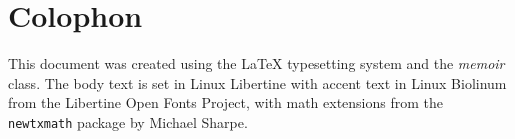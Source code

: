 \documentclass[../book/calcnotes.tex]{subfiles}
\begin{document}
\chapter{Colophon}

This document was created using the \LaTeX{} typesetting system and the \textit{memoir} class.
The body text is set in Linux Libertine with accent text in Linux Biolinum from the Libertine Open Fonts Project, with math extensions from the \texttt{newtxmath} package by Michael Sharpe.
\end{document}
